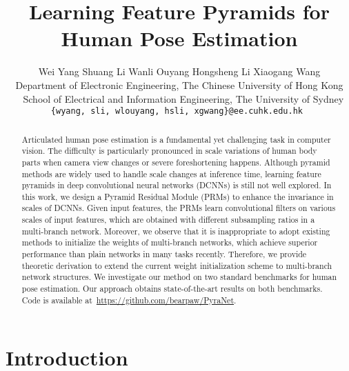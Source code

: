 \documentclass[10pt,twocolumn,letterpaper]{article}
\begin{document}
\title{Learning Feature Pyramids for Human Pose Estimation}

\author{
Wei Yang \quad 
Shuang Li \quad 
Wanli Ouyang \quad 
Hongsheng Li \quad
Xiaogang Wang \\
 Department of Electronic Engineering, The Chinese University of Hong Kong\\
~ School of Electrical and Information Engineering, The University of Sydney \\
{\tt\small \{wyang, sli, wlouyang, hsli, xgwang\}@ee.cuhk.edu.hk  } \\
}

\maketitle
\thispagestyle{empty}


\begin{abstract}
Articulated human pose estimation is a fundamental yet challenging task in computer vision. 
The difficulty is particularly pronounced in scale variations of human body parts when camera view changes or severe foreshortening happens. 
Although pyramid methods are widely used to handle scale changes at inference time, learning feature pyramids in deep convolutional neural networks (DCNNs) is still not well explored. 
In this work, we design a Pyramid Residual Module (PRMs) to enhance the invariance in scales of DCNNs. 
Given input features, the PRMs learn convolutional filters on various scales of input features, which are obtained with different subsampling ratios in a multi-branch network. 
Moreover, we observe that it is inappropriate to adopt existing methods to initialize the weights of multi-branch networks, 
which achieve superior performance than plain networks in many tasks recently. 
Therefore, we provide theoretic derivation to extend the current weight initialization scheme to multi-branch network structures. 
We investigate our method on two standard benchmarks for human pose estimation. 
Our approach obtains state-of-the-art results on both benchmarks. 
Code is available at~\url{https://github.com/bearpaw/PyraNet}. 
 


\end{abstract}



\section{Introduction}
\end{document}
